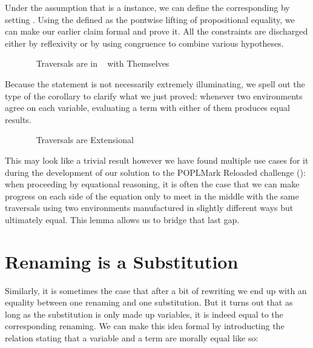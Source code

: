 Under the assumption that  is a  instance, we can define the
corresponding   by setting
.
Using  the  defined as the pontwise lifting of propositional equality,
we can make our earlier claim formal and prove it. All the constraints are discharged
either by reflexivity or by using congruence to combine various hypotheses.

\begin{figure}[h]
\caption{~ Traversals are in ~ with Themselves\label{fig:synselfsim}}
\end{figure}

Because the  statement is not necessarily extremely illuminating, we spell
out the type of the corollary to clarify what we just proved: whenever two environments
agree on each variable, evaluating a term with either of them produces equal results.

\begin{figure}[h]
\caption{~ Traversals are Extensional\label{fig:synextensional}}
\end{figure}

This may look like a trivial result however we have found multiple use cases for it
during the development of our solution to the POPLMark Reloaded challenge
(\citeyear{poplmark2}): when proceeding by equational reasoning, it is often the case
that we can make progress on each side of the equation only to meet in the middle with
the same traversals using two environments manufactured in slightly different ways but
ultimately equal. This lemma allows us to bridge that last gap.

\section{Renaming is a Substitution}

Similarly, it is sometimes the case that after a bit of rewriting we end up with an
equality between one renaming and one substitution. But it turns out that as long as
the substitution is only made up variables, it is indeed equal to the corresponding
renaming. We can make this idea formal by introducting the  relation
stating that a variable and a term are morally equal like so:


